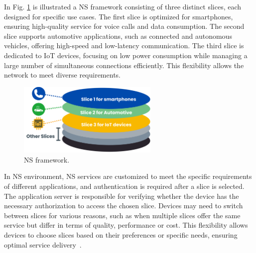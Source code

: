 \documentclass[graybox]{svmult}
\begin{document}
In Fig. \ref{fig:NS} is illustrated a NS framework consisting of three distinct slices, each designed for specific use cases. The first slice is optimized for smartphones, ensuring high-quality service for voice calls and data consumption. The second slice supports automotive applications, such as connected and autonomous vehicles, offering high-speed and low-latency communication. The third slice is dedicated to IoT devices, focusing on low power consumption while managing a large number of simultaneous connections efficiently. This flexibility allows the network to meet diverse requirements.

\begin{figure}[H]\centering
	\includegraphics[width=0.6\textwidth]{figure/slices.png}
	\caption{NS framework.}\label{fig:NS}
\end{figure}

In NS environment, NS services are customized to meet the specific requirements of different applications, and authentication is required after a slice is selected. The application server is responsible for verifying whether the device has the necessary authorization to access the chosen slice. Devices may need to switch between slices for various reasons, such as when multiple slices offer the same service but differ in terms of quality, performance or cost. This flexibility allows devices to choose slices based on their preferences or specific needs, ensuring optimal service delivery~\cite{9843870, 9911525}.



\end{document}

